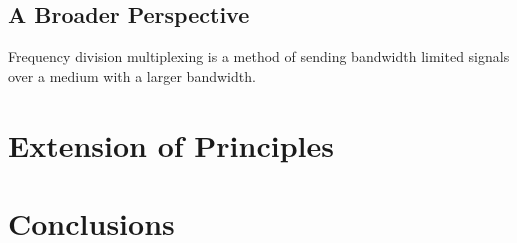 \documentclass[12pt]{article}
\begin{document}

\subsection{A Broader Perspective}

Frequency division multiplexing is a method of sending bandwidth limited 
signals over a medium with a larger bandwidth. 

\section{Extension of Principles}


\section{Conclusions}
\end{document}
